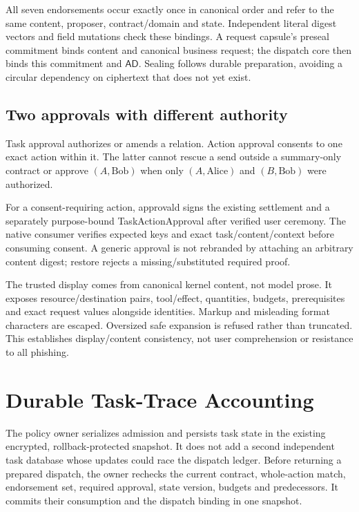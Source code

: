 \documentclass[letterpaper,twocolumn,10pt]{article}
\newcommand{\AD}{\ensuremath{\mathsf{AD}}}
\begin{document}
All seven endorsements occur exactly once in canonical order and refer to the
same content, proposer, contract/domain and state. Independent literal digest
vectors and field mutations check these bindings. A request capsule's preseal
commitment binds content and canonical business request; the dispatch core
then binds this commitment and \AD. Sealing follows durable preparation,
avoiding a circular dependency on ciphertext that does not yet exist.

\subsection{Two approvals with different authority}

Task approval authorizes or amends a relation. Action approval consents to
one exact action within it. The latter cannot rescue a send outside a
summary-only contract or approve $(A,\mathrm{Bob})$ when only
$(A,\mathrm{Alice})$ and $(B,\mathrm{Bob})$ were authorized.

For a consent-requiring action, approvald signs the existing settlement and a
separately purpose-bound TaskActionApproval after verified user ceremony.
The native consumer verifies expected keys and exact task/content/context
before consuming consent. A generic approval is not rebranded by attaching an
arbitrary content digest; restore rejects a missing/substituted required proof.

The trusted display comes from canonical kernel content, not model prose.
It exposes resource/destination pairs, tool/effect, quantities, budgets,
prerequisites and exact request values alongside identities. Markup and misleading
format characters are escaped. Oversized safe expansion is refused rather than
truncated. This establishes display/content consistency, not user comprehension
or resistance to all phishing.

\section{Durable Task-Trace Accounting}
\label{sec:durable}

The policy owner serializes admission and persists task state in the existing
encrypted, rollback-protected snapshot. It does not add a second independent
task database whose updates could race the dispatch ledger. Before returning a
prepared dispatch, the owner rechecks the current contract, whole-action match,
endorsement set, required approval, state version, budgets and predecessors.
It commits their consumption and the dispatch binding in one snapshot.
\end{document}
